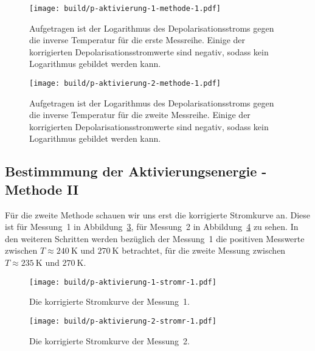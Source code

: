 \begin{figure}
  \centering
  \texttt{[image: build/p-aktivierung-1-methode-1.pdf]}
  \caption{Aufgetragen ist der Logarithmus des Depolarisationsstroms gegen die
    inverse Temperatur für die erste Messreihe.
    Einige der korrigierten Depolarisationsstromwerte sind negativ,
    sodass kein Logarithmus gebildet werden kann.}
  \label{fig:akt-1-methode-1}
\end{figure}

\begin{figure}
  \centering
  \texttt{[image: build/p-aktivierung-2-methode-1.pdf]}
  \caption{Aufgetragen ist der Logarithmus des Depolarisationsstroms gegen die
    inverse Temperatur für die zweite Messreihe.
    Einige der korrigierten Depolarisationsstromwerte sind negativ,
    sodass kein Logarithmus gebildet werden kann.}
  \label{fig:akt-2-methode-1}
\end{figure}

\newpage

\subsection{Bestimmmung der Aktivierungsenergie - Methode II}
Für die zweite Methode schauen wir uns erst die korrigierte Stromkurve an.
Diese ist für Messung~1 in Abbildung~\ref{fig:stromr1}, für Messung~2 in
Abbildung~\ref{fig:stromr2} zu sehen. In den weiteren Schritten werden
bezüglich der Messung~1 die positiven Messwerte zwischen
$T \approx \SI{240}{\kelvin}$ und $\SI{270}{\kelvin}$ betrachtet,
für die zweite Messung zwischen $T \approx \SI{235}{\kelvin}$ und
$\SI{270}{\kelvin}$.

\begin{figure}
  \centering
  \texttt{[image: build/p-aktivierung-1-stromr-1.pdf]}
  \caption{Die korrigierte Stromkurve der Messung~1.}
  \label{fig:stromr1}
\end{figure}
\begin{figure}
  \centering
  \texttt{[image: build/p-aktivierung-2-stromr-1.pdf]}
  \caption{Die korrigierte Stromkurve der Messung~2.}
  \label{fig:stromr2}
\end{figure}

